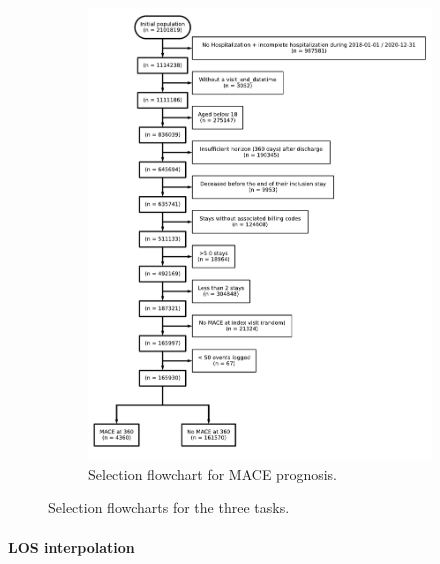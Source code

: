 \documentclass[french,12pt,twoside,a4paper]{book}
\begin{document}
\begin{appendices}
\begin{figure}[!h]
\begin{subfigure}[b]{0.5\textwidth}
      \includegraphics[width=1.1\textwidth]{img/chapter_3/flowchart_t3_mace.pdf}
      \caption{Selection flowchart for MACE prognosis.}
      \label{apd:fig:flowchart_t3}
    \end{subfigure}
    \caption{Selection flowcharts for the three tasks.}
    \label{apd:fig:flowcharts}
  \end{figure}

  \paragraph{LOS interpolation}\label{apd:task_details:los}


\end{appendices}
\end{document}
